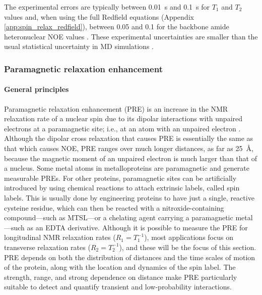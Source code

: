 \documentclass[9pt,review,pubversion]{livecoms}
\begin{document}
The experimental errors are typically between \qty{0.01}{\second} and \qty{0.1}{\second} for $T_1$ and $T_2$ values and, when using the full Redfield equations (Appendix \ref{app:spin_relax_redfield}), between 0.05 and 0.1 for the backbone amide heteronuclear NOE values \cite{hoch_biological_2023}.
These experimental uncertainties are smaller than the usual statistical uncertainty in MD simulations \cite{sandelin_qebss_2024}.

\subsubsection{Paramagnetic relaxation enhancement}
\label{sub2:pre}

\paragraph{General principles}

Paramagnetic relaxation enhancement (PRE) is an increase in the NMR relaxation rate of a nuclear spin due to its dipolar interactions with unpaired electrons at a paramagnetic site; i.e., at an atom with an unpaired electron \cite{clore_elucidating_2007,clore2009theory}.
Although the dipolar cross relaxation that causes PRE is essentially the same as that which causes NOE, PRE ranges over much longer distances, as far as \qty{25}{\angstrom}, because the magnetic moment of an unpaired electron is much larger than that of a nucleus.
Some metal atoms in metalloproteins are paramagnetic and generate measurable PREs.
For other proteins, paramagnetic sites can be artificially introduced by using chemical reactions to attach extrinsic labels, called spin labels.
This is usually done by engineering proteins to have just a single, reactive cysteine residue, which can then be reacted with a nitroxide-containing compound---such as MTSL---or a chelating agent carrying a paramagnetic metal---such as an EDTA derivative.
Although it is possible to measure the PRE for longitudinal NMR relaxation rates ($R_1=T_1^{-1}$), most applications focus on transverse relaxation rates ($R_2=T_2^{-1}$), and these will be the focus of this section.
PRE depends on both the distribution of distances and the time scales of motion of the protein, along with the location and dynamics of the spin label.
The strength, range, and strong dependence on distance make PRE particularly suitable to detect and quantify transient and low-probability interactions.
\end{document}
